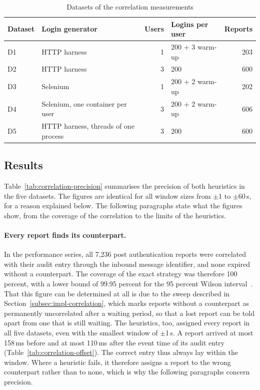 \documentclass[../main.tex]{subfiles}
\begin{document}
\begin{table}[h]
\centering
\caption{Datasets of the correlation measurements}\label{tab:correlation-datasets}
\small
\begin{tabular}{llrlr}
\toprule
Dataset & Login generator & Users & Logins per user & Reports \\
\midrule
D1 & HTTP harness                         & 1 & 200 + 3 warm-up & 203 \\
D2 & HTTP harness                         & 3 & 200             & 600 \\
D3 & Selenium                             & 1 & 200 + 2 warm-up & 202 \\
D4 & Selenium, one container per user     & 3 & 200 + 2 warm-up & 606 \\
D5 & HTTP harness, threads of one process & 3 & 200             & 600 \\
\bottomrule
\end{tabular}
\end{table}

\subsection{Results}\label{subsec:eval-correlation-results}

Table~\ref{tab:correlation-precision} summarises the precision of both heuristics in the five 
datasets. 
The figures are identical for all window sizes from $\pm$1 to $\pm$60\,s, for a reason explained 
below. 
The following paragraphs state what the figures show, from the coverage of the correlation to the 
limits of the heuristics.

\paragraph{Every report finds its counterpart.}
In the performance series, all 7{,}236 post authentication reports were correlated with their 
audit entry through the inbound message identifier, and none expired without a counterpart. 
The coverage of the exact strategy was therefore 100 percent, with a lower bound of 99.95 percent 
for the 95 percent Wilson interval~\cite{Wilson}. 
That this figure can be determined at all is due to the sweep described in 
Section~\ref{subsec:impl-correlation}, which marks reports without a counterpart as permanently 
uncorrelated after a waiting period, so that a lost report can be told apart from one that is still 
waiting. 
The heuristics, too, assigned every report in all five datasets, even with the smallest window of $\pm$1\,s. 
A report arrived at most 158\,ms before and at most 110\,ms after the event time of its audit 
entry (Table~\ref{tab:correlation-offset}). 
The correct entry thus always lay within the window. 
Where a heuristic fails, it therefore assigns a report to the wrong counterpart rather than to none, 
which is why the following paragraphs concern precision.
\end{document}
